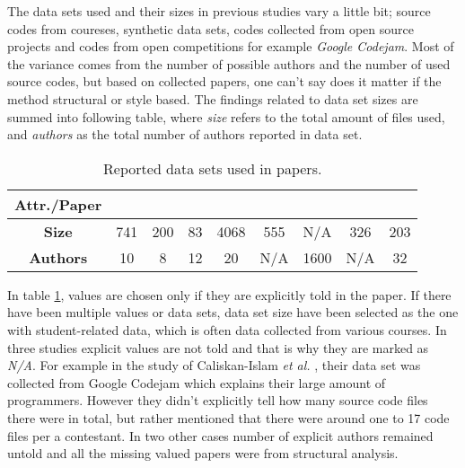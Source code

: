 \documentclass[english]{tktltiki2}
\theoremstyle{definition}
\theoremstyle{remark}
\begin{document}
The data sets used and their sizes in previous studies vary a little bit; source codes from coureses, synthetic data sets, codes collected from open source projects and codes from open competitions for example \textit{Google Codejam}.  Most of the variance comes from the number of possible authors and the number of used source codes, but based on collected papers, one can't say does it matter if the method structural or style based. The findings related to data set sizes are summed into following table, where \textit{size} refers to the total amount of files used, and \textit{authors} as the total number of authors reported in data set. 

\begin{table}[ht]
\centering
\begin{tabular}{c|cccccccc}
\textbf{Attr./Paper} & \cite{bandara2011machine}   & \cite{kothari2007probabilistic}   & \cite{Elenbogen:2008:DOS:1295109.1295123}  & \cite{lange2007using}    & \cite{Son:2013:APS:2508269.2508323}   & \cite{caliskan2015anonymizing}    & \cite{jadalla2008pde4java}   & \cite{rosenblum2011wrote}   \\ \hline
\textbf{Size}        & 741 & 200 & 83 & 4068 & 555 & N/A  & 326 & 203 \\
\textbf{Authors}     & 10  & 8   & 12 & 20   & N/A & 1600 & N/A & 32 
\end{tabular}
\caption{Reported data sets used in papers.}
\label{table:data}
\end{table}

\noindent
In table \ref{table:data}, values are chosen only if they are explicitly told in the paper. If there have been multiple values or data sets, data set size have been selected as the one with student-related data, which is often data collected from various courses. In three studies explicit values are not told and that is why they are marked as \textit{N/A}. For example in the study of Caliskan-Islam \textit{et al.} \cite{caliskan2015anonymizing}, their data set was collected from Google Codejam which explains their large amount of programmers. However they didn't explicitly tell how many source code files there were in total, but rather mentioned that there were around one to 17 code files per a contestant. In two other cases number of explicit authors remained untold and all the missing valued papers were from structural analysis. 
\end{document}
